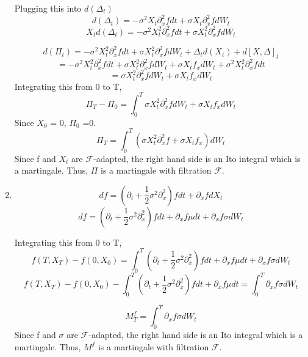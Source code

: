 \documentclass[a4paper,11pt]{article}
\begin{document}
\begin{enumerate}
Plugging this into $d(\Delta_t)$
\[d(\Delta_t) = - \sigma^2 X_t \partial_x^2 f dt + \sigma X_t\partial_x^2 f dW_t\]
\[X_td(\Delta_t) = - \sigma^2 X_t^2 \partial_x^2 f dt + \sigma X_t^2\partial_x^2 f dW_t\]

\[d(\Pi_t) =  - \sigma^2 X_t^2 \partial_x^2 f dt + \sigma X_t^2\partial_x^2 f dW_t + \Delta_t d(X_t) + d[X,\Delta]_t\]
\[=  - \sigma^2 X_t^2 \partial_x^2 f dt + \sigma X_t^2\partial_x^2 f dW_t + \sigma X_t f_x dW_t + \sigma^2 X_t^2\partial_x^2 f dt \]
\[= \sigma X_t^2\partial_x^2 f dW_t + \sigma X_t f_x dW_t \]
Integrating this from 0 to T,
\[\Pi_T -\Pi_0= \int_0^T \sigma X_t^2\partial_x^2 f dW_t + \sigma X_t f_x dW_t \]
Since $X_0$ = 0, $\Pi_0$ =0.
\[\Pi_T = \int_0^T (\sigma X_t^2\partial_x^2 f + \sigma X_t f_x)dW_t \]
Since f and $X_t$ are $\mathcal{F}$-adapted, the right hand side is an Ito integral which is a martingale. Thus, $\Pi$ is a martingale with filtration $\mathcal{F}$.

\item

\[df = (\partial_t + \frac{1}{2} \sigma^2 \partial_x^2)fdt + \partial_x f  dX_t \]
\[df= (\partial_t + \frac{1}{2} \sigma^2 \partial_x^2)f dt+ \partial_x f \mu dt  + \partial_x f \sigma dW_t\]

Integrating this from 0 to T,
\[f(T,X_T)-f(0,X_0)= \int_0^T(\partial_t + \frac{1}{2} \sigma^2 \partial_x^2)fdt + \partial_x f \mu dt  + \partial_x f \sigma dW_t\]
\[f(T,X_T)-f(0,X_0) -\int_0^T(\partial_t + \frac{1}{2} \sigma^2 \partial_x^2)fdt + \partial_x f \mu dt  =   \int_0^T\partial_x f \sigma dW_t\]

\[M_T^f =   \int_0^T\partial_x f \sigma dW_t\]
Since f and $\sigma$ are $\mathcal{F}$-adapted, the right hand side is an Ito integral which is a martingale. Thus, $M^f$ is a martingale with filtration $\mathcal{F}$.
\end{enumerate}  
\end{document}
